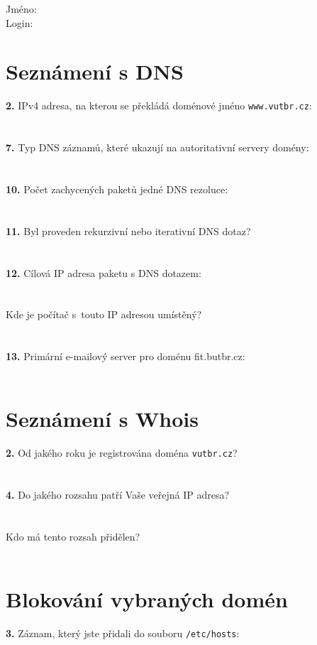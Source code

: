 Jméno:\\
Login:\\

\section{Seznámení s DNS}
\textbf{2.} IPv4 adresa, na kterou se překládá doménové jméno {\tt www.vutbr.cz}:\\
\\
\\
\textbf{7.} Typ DNS záznamů, které ukazují na autoritativní servery domény:\\
\\
\\
\textbf{10.} Počet zachycených paketů jedné DNS rezoluce: \\
\\
\\
\textbf{11.} Byl proveden rekurzivní nebo iterativní DNS dotaz?\\
\\
\\
\textbf{12.} Cílová IP adresa paketu s DNS dotazem:\\
\\
\\
Kde je počítač s~touto IP adresou umístěný?\\
\\
\\
\textbf{13.} Primární e-mailový server pro doménu fit.butbr.cz:\\
\\


\section{Seznámení s Whois}
\textbf{2.} Od jakého roku je registrována doména {\tt vutbr.cz}?\\
\\
\\
\textbf{4.} Do jakého rozsahu patří Vaše veřejná IP adresa?\\
\\
\\
Kdo má tento rozsah přidělen?\\
\\


\section{Blokování vybraných domén}

\textbf{3.} Záznam, který jste přidali do souboru {\tt /etc/hosts}:\\
\\
\\
\\


